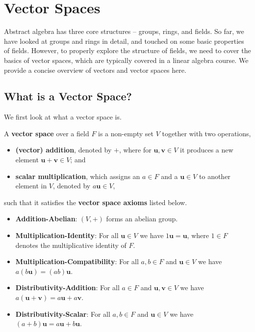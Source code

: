 \chapter{Vector Spaces}
Abstract algebra has three core structures -- groups, rings, and fields. So far, we have looked at groups and rings in detail, and touched on some basic properties of fields. However, to properly explore the structure of fields, we need to cover the basics of vector spaces, which are typically covered in a linear algebra course. We provide a concise overview of vectors and vector spaces here.

\section{What is a Vector Space?}
We first look at what a vector space is.
\begin{definition}
    A \textbf{vector space} over a field $F$ is a non-empty set $V$ together with two operations,
    \begin{itemize}
        \item \textbf{(vector) addition}, denoted by $+$, where for $\textbf{u}, \textbf{v} \in V$ it produces a new element $\textbf{u} + \textbf{v} \in V$; and
        \item \textbf{scalar multiplication}, which assigns an $a \in F$ and a $\textbf{u} \in V$ to another element in $V$, denoted by $a\textbf{u} \in V$,
    \end{itemize}
    such that it satisfies the \textbf{vector space axioms} listed below.
    \begin{itemize}
        \item \textbf{Addition-Abelian}: $(V, +)$ forms an abelian group.
        \item \textbf{Multiplication-Identity}: For all $\textbf{u} \in V$ we have $1\textbf{u} = \textbf{u}$, where $1 \in F$ denotes the multiplicative identity of $F$.
        \item \textbf{Multiplication-Compatibility}: For all $a,b  \in F$ and $\textbf{u} \in V$ we have $a(b\textbf{u}) = (ab)\textbf{u}$.
        \item \textbf{Distributivity-Addition}: For all $a \in F$ and $\textbf{u}, \textbf{v} \in V$ we have $a(\textbf{u} + \textbf{v}) = a\textbf{u} + a\textbf{v}$.
        \item \textbf{Distributivity-Scalar}: For all $a, b \in F$ and $\textbf{u} \in V$ we have $(a+b)\textbf{u} = a\textbf{u} + b\textbf{u}$.
    \end{itemize}
\end{definition}

